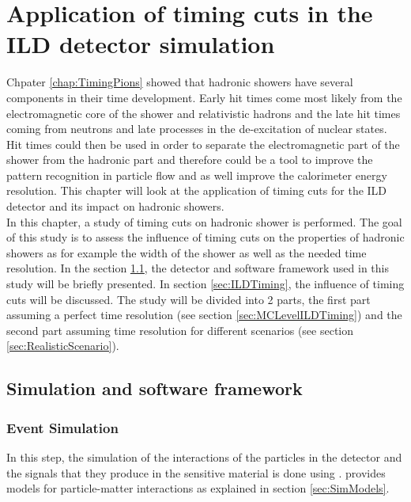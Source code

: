 \chapter{Application of timing cuts in the ILD detector simulation}
\label{chap:ILDTiming}

Chpater \ref{chap:TimingPions} showed that hadronic showers have several components in their time development. Early hit times come most likely from the electromagnetic core of the shower and relativistic hadrons and the late hit times coming from neutrons and late processes in the de-excitation of nuclear states. Hit times could then be used in order to separate the electromagnetic part of the shower from the hadronic part and therefore could be a tool to improve the pattern recognition in particle flow and as well improve the calorimeter energy resolution. This chapter will look at the application of timing cuts for the ILD detector and its impact on hadronic showers.\\

In this chapter, a study of timing cuts on hadronic shower is performed. The goal of this study is to assess the influence of timing cuts on the properties of hadronic showers as for example the width of the shower as well as the needed time resolution. In the section \ref{sec:Framework}, the detector and software framework used in this study will be briefly presented. In section \ref{sec:ILDTiming}, the influence of timing cuts will be discussed. The study will be divided into 2 parts, the first part assuming a perfect time resolution (see section \ref{sec:MCLevelILDTiming}) and the second part assuming time resolution for different scenarios (see section \ref{sec:RealisticScenario}).

\section{Simulation and software framework}
\label{sec:Framework}

\subsection{Event Simulation}

In this step, the simulation of the interactions of the particles in the detector and the signals that they produce in the sensitive material is done using \geant. \geant provides models for particle-matter interactions as explained in section \ref{sec:SimModels}.

